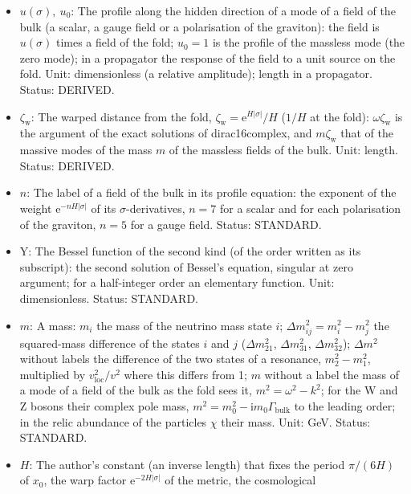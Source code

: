 \documentclass[
  10pt,
]{article}
\providecommand{\tightlist}{%
  \setlength{\itemsep}{0pt}\setlength{\parskip}{0pt}}
\begin{document}
\begin{itemize}
\tightlist
\item
  \(u(\sigma),\ u_0\): The profile along the hidden direction of a mode
  of a field of the bulk (a scalar, a gauge field or a polarisation of
  the graviton): the field is \(u(\sigma)\) times a field of the fold;
  \(u_0 = 1\) is the profile of the massless mode (the zero mode); in a
  propagator the response of the field to a unit source on the fold.
  Unit: dimensionless (a relative amplitude); length in a propagator.
  Status: DERIVED.
\item
  \(\zeta_{\mathrm{w}}\): The warped distance from the fold,
  \(\zeta_{\mathrm{w}} = \mathrm{e}^{H\lvert\sigma\rvert}/H\) (\(1/H\)
  at the fold): \(\omega\zeta_{\mathrm{w}}\) is the argument of the
  exact solutions of dirac16complex, and \(m\zeta_{\mathrm{w}}\) that of
  the massive modes of the mass \(m\) of the massless fields of the
  bulk. Unit: length. Status: DERIVED.
\item
  \(n\): The label of a field of the bulk in its profile equation: the
  exponent of the weight \(\mathrm{e}^{-nH\lvert\sigma\rvert}\) of its
  \(\sigma\)-derivatives, \(n = 7\) for a scalar and for each
  polarisation of the graviton, \(n = 5\) for a gauge field. Status:
  STANDARD.
\item
  \(\mathrm{Y}\): The Bessel function of the second kind (of the order
  written as its subscript): the second solution of Bessel's equation,
  singular at zero argument; for a half-integer order an elementary
  function. Unit: dimensionless. Status: STANDARD.
\item
  \(m\): A mass: \(m_i\) the mass of the neutrino mass state \(i\);
  \(\Delta m_{ij}^2 = m_i^2 - m_j^2\) the squared-mass difference of the
  states \(i\) and \(j\) (\(\Delta m_{21}^2\), \(\Delta m_{31}^2\),
  \(\Delta m_{32}^2\)); \(\Delta m^2\) without labels the difference of
  the two states of a resonance, \(m_2^2 - m_1^2\), multiplied by
  \(v_{\mathrm{loc}}^2/v^2\) where this differs from 1; \(m\) without a
  label the mass of a mode of a field of the bulk as the fold sees it,
  \(m^2 = \omega^2 - k^2\); for the W and Z bosons their complex pole
  mass, \(m^2 = m_0^2 - \mathrm{i}m_0\Gamma_{\mathrm{bulk}}\) to the
  leading order; in the relic abundance of the particles \(\chi\) their
  mass. Unit: GeV. Status: STANDARD.
\item
  \(H\): The author's constant (an inverse length) that fixes the period
  \(\pi/(6H)\) of \(x_0\), the warp factor
  \(\mathrm{e}^{-2H\lvert\sigma\rvert}\) of the metric, the cosmological

\end{itemize}
\end{document}
